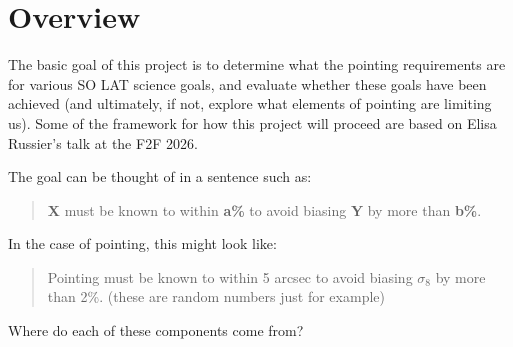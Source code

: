 \def\mnu{m_\nu}
\def\neff{$N_{\rm eff.}$}
\def\LCDM{$\Lambda$CDM}


\section{Overview}
The basic goal of this project is to determine what the pointing requirements are for various SO LAT science goals, and evaluate whether these goals have been achieved (and ultimately, if not, explore what elements of pointing are limiting us). Some of the framework for how this project will proceed are based on Elisa Russier's talk at the F2F 2026. 

The goal can be thought of in a sentence such as:
\begin{quotation}
    {\bf X} must be known to within {\bf a\%} to avoid biasing {\bf Y} by more than {\bf b\%}.
\end{quotation}

In the case of pointing, this might look like:
\begin{quotation}
    Pointing must be known to within 5 arcsec to avoid biasing {$\sigma_8$} by more than {2\%}. (these are random numbers just for example)
\end{quotation}

Where do each of these components come from? 

\pagebreak

